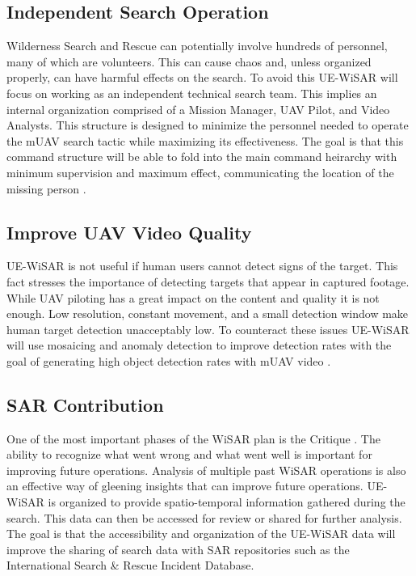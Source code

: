 \subsection{Independent Search Operation}
Wilderness Search and Rescue can potentially involve hundreds of personnel, many
of which are volunteers.  This can cause chaos and, unless organized properly,
can have harmful effects on the search.  To avoid this UE-WiSAR will focus on
working as an independent technical search team.  This implies an internal
organization comprised of a Mission Manager, UAV Pilot, and Video Analysts. 
This structure is designed to minimize the personnel needed to operate the mUAV
search tactic while maximizing its effectiveness.  The goal is that this command
structure will be able to fold into the main command heirarchy with minimum
supervision and maximum effect, communicating the location of the missing
person \cite{goodrich2008supporting}.

\subsection{Improve UAV Video Quality}
UE-WiSAR is not useful if human users cannot detect signs of the target.  This
fact stresses the importance of detecting targets that appear in captured
footage. While UAV piloting has a great impact on the content and quality it
is not enough.  Low resolution, constant movement, and a small detection window
make human target detection unacceptably low.  To counteract these issues
UE-WiSAR will use mosaicing and anomaly detection to improve detection
rates with the goal of generating high object detection rates with mUAV video
\cite{thornton2011detection, morse2008application}.

\subsection{SAR Contribution}
One of the most important phases of the WiSAR plan is the
Critique \cite{setnicka1980}.  The ability to recognize what went wrong and what
went well is important for improving future operations.  Analysis of multiple
past WiSAR operations is also an effective way of gleening insights that can
improve future operations.  UE-WiSAR is organized to provide spatio-temporal
information gathered during the search.  This data can then be accessed for
review or shared for further analysis.  The goal is that the accessibility and
organization of the UE-WiSAR data will improve the sharing of search data with
SAR repositories such as the International Search \& Rescue Incident Database.

